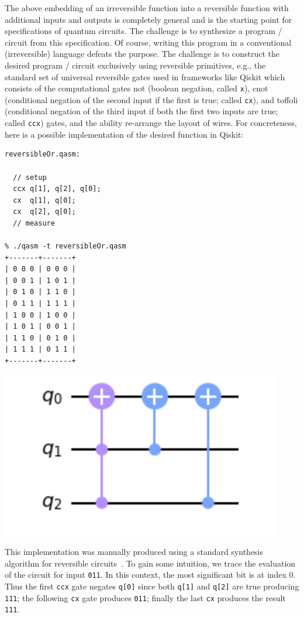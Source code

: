 The above embedding of an irreversible function into a reversible function with additional inputs and outputs is completely general and is the starting point for specifications of quantum circuits. The challenge is to synthesize a program / circuit from this specification. Of course, writing this program in a conventional (irreversible) language defeats the purpose. The challenge is to construct the desired program / circuit exclusively using reversible primitives, e.g., the standard set of universal reversible gates used in frameworks like Qiskit which consists of the computational gates \textsf{not} (boolean negation, called \verb|x|), \textsf{cnot} (conditional negation of the second input if the first is true; called \verb|cx|), and \textsf{toffoli} (conditional negation of the third input if both the first two inputs are true; called \verb|ccx|) gates, and the ability re-arrange the layout of wires. For concreteness, here is a possible implementation of the desired function in Qiskit:

\begin{center}
  \begin{minipage}[c]{0.4\linewidth}
\begin{verbatim}
reversibleOr.qasm:

  // setup
  ccx q[1], q[2], q[0];
  cx  q[1], q[0];
  cx  q[2], q[0];
  // measure

% ./qasm -t reversibleOr.qasm
+-------+-------+
| 0 0 0 | 0 0 0 |
| 0 0 1 | 1 0 1 |
| 0 1 0 | 1 1 0 |
| 0 1 1 | 1 1 1 |
| 1 0 0 | 1 0 0 |
| 1 0 1 | 0 0 1 |
| 1 1 0 | 0 1 0 |
| 1 1 1 | 0 1 1 |
+-------+-------+
  \end{verbatim}
  \end{minipage}
  \qquad
  \includegraphics[scale=0.7]{reversibleOr.png}
\end{center}

\noindent This implementation was manually produced using a standard synthesis algorithm for reversible
circuits~\cite{10.1145/775832.775915}. To gain some intuition, we trace the evaluation of the circuit for input
\verb|011|. In this context, the most significant bit is at index 0. Thus the first \verb|ccx| gate negates \verb|q[0]|
since both \verb|q[1]| and \verb|q[2]| are true producing \verb|111|; the following \verb|cx| gate produces \verb|011|; finally the last \verb|cx| produces the result \verb|111|.


